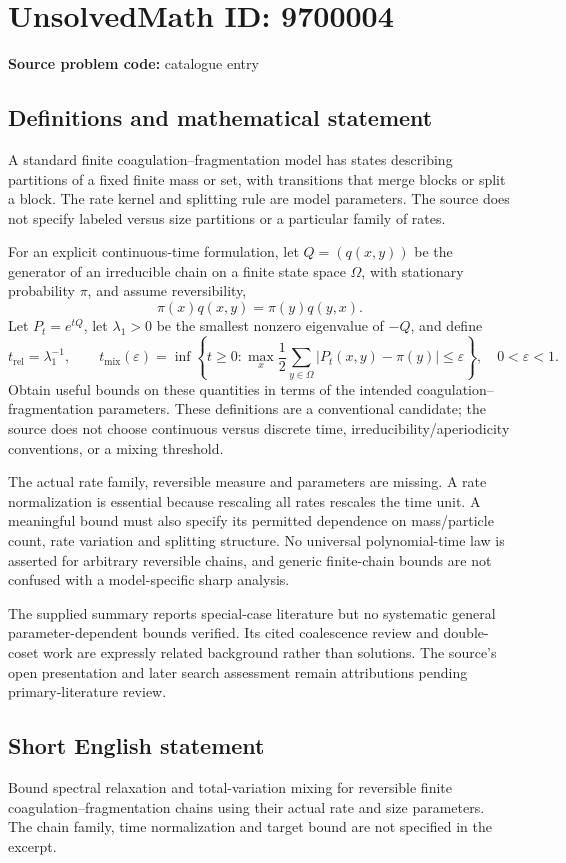 \documentclass[11pt]{article}
\begin{document}
\section*{UnsolvedMath ID: 9700004}
\textbf{Source problem code:} catalogue entry
\subsection{Definitions and mathematical statement}
A standard finite coagulation--fragmentation model has states describing partitions of a fixed finite mass or set, with transitions that merge blocks or split a block. The rate kernel and splitting rule are model parameters. The source does not specify labeled versus size partitions or a particular family of rates.

For an explicit continuous-time formulation, let \(Q=(q(x,y))\) be the generator of an irreducible chain on a finite state space \(\Omega\), with stationary probability \(\pi\), and assume reversibility,
\[
 \pi(x)q(x,y)=\pi(y)q(y,x).
\]
Let \(P_t=e^{tQ}\), let \(\lambda_1>0\) be the smallest nonzero eigenvalue of \(-Q\), and define
\[
 t_{\mathrm{rel}}=\lambda_1^{-1},\qquad
 t_{\mathrm{mix}}(\varepsilon)=\inf\left\{t\ge0:
 \max_x\frac12\sum_{y\in\Omega}|P_t(x,y)-\pi(y)|\le\varepsilon\right\},
 \quad0<\varepsilon<1.
\]
Obtain useful bounds on these quantities in terms of the intended coagulation--fragmentation parameters. These definitions are a conventional candidate; the source does not choose continuous versus discrete time, irreducibility/aperiodicity conventions, or a mixing threshold.

The actual rate family, reversible measure and parameters are missing. A rate normalization is essential because rescaling all rates rescales the time unit. A meaningful bound must also specify its permitted dependence on mass/particle count, rate variation and splitting structure. No universal polynomial-time law is asserted for arbitrary reversible chains, and generic finite-chain bounds are not confused with a model-specific sharp analysis.

The supplied summary reports special-case literature but no systematic general parameter-dependent bounds verified. Its cited coalescence review and double-coset work are expressly related background rather than solutions. The source's open presentation and later search assessment remain attributions pending primary-literature review.
\subsection{Short English statement}
Bound spectral relaxation and total-variation mixing for reversible finite coagulation–fragmentation chains using their actual rate and size parameters. The chain family, time normalization and target bound are not specified in the excerpt.
\end{document}

